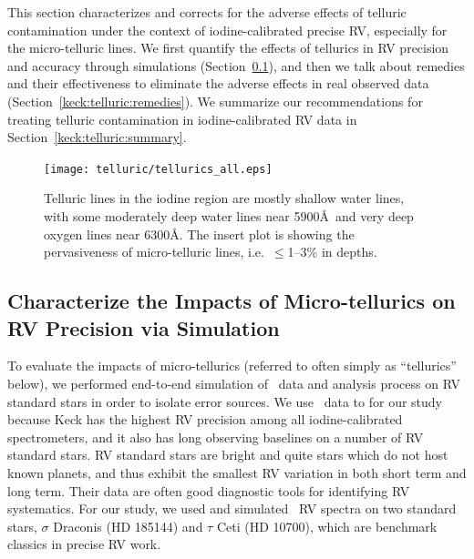 This section characterizes and corrects for the adverse effects of
telluric contamination under the context of iodine-calibrated precise
RV, especially for the micro-telluric lines. We first quantify the
effects of tellurics in RV precision and accuracy through simulations
(Section~\ref{keck:telluric:impact}), and then we talk about remedies
and their effectiveness to eliminate the adverse effects in real
observed data (Section~\ref{keck:telluric:remedies}). We summarize our
recommendations for treating telluric contamination in
iodine-calibrated RV data in Section~\ref{keck:telluric:summary}.


\begin{figure}
\texttt{[image: telluric/tellurics\_all.eps]} 
\caption{Telluric lines in the iodine region are mostly shallow water
lines, with some moderately deep water lines near 5900\AA\ and very
deep oxygen lines near 6300\AA. The insert plot is showing the
pervasiveness of micro-telluric lines, i.e.~$\leq$1--3\% in depths.
\label{telluric:fig:telluric}}
\end{figure}



\subsection{Characterize the Impacts of Micro-tellurics on RV
  Precision via Simulation}\label{keck:telluric:impact} 

To evaluate the impacts of micro-tellurics (referred to often simply
as ``tellurics'' below), we performed end-to-end simulation of \keck\
data and analysis process on RV standard stars in order to isolate
error sources. We use \keck\ data to for our study because Keck has
the highest RV precision among all iodine-calibrated spectrometers,
and it also has long observing baselines on a number of RV standard
stars. RV standard stars are bright and quite stars which do not host
known planets, and thus exhibit the smallest RV variation in both
short term and long term. Their data are often good diagnostic tools
for identifying RV systematics. For our study, we used and simulated
\keck\ RV spectra on two standard stars, $\sigma$ Draconis (HD 185144)
and $\tau$ Ceti (HD 10700), which are benchmark classics in precise RV
work.

